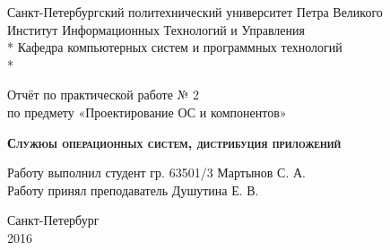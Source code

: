 \begin{titlepage}
\thispagestyle{empty}

\begin{center}
Санкт-Петербургский политехнический университет Петра Великого\\
Институт Информационных Технологий и Управления \\*
Кафедра компьютерных систем и программных технологий \\*
\hrulefill
\end{center}

\vspace{15em}

\begin{center}
\Large Отчёт по практической работе № 2\\по предмету «Проектирование ОС и компонентов» \\
\end{center}

\vspace{1em}

\begin{center}
\textsc{\textbf{Служюы операционных систем, дистрибуция приложений}}
\end{center}

\vspace{20em}

\begin{flushleft}
Работу выполнил студент гр. 63501/3 \hrulefill Мартынов С. А. \\
\vspace{1.5em}
Работу принял преподаватель \hrulefill Душутина Е. В. \\
\end{flushleft}

\vspace{\fill}

\begin{center}
Санкт-Петербург \\
2016
\end{center}

\end{titlepage}
\setcounter{page}{2}